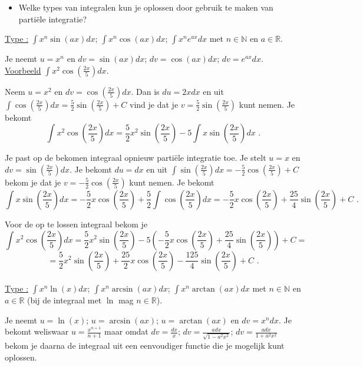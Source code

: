 \documentclass{article}
\begin{document}
\begin{itemize}
\item Welke types van integralen kun je oplossen door gebruik te maken van parti\"ele integratie?
\end{itemize}

\noindent \underline{Type :} $\int x^n \sin(ax)dx$; $\int x^n \cos (ax)dx$; $\int x^n e^{ax}dx$ met $n \in \mathbb{N}$ en $a \in \mathbb{R}$.

\noindent Je neemt $u=x^n$ en $dv=\sin (ax)dx$; $dv=\cos (ax)dx$; $dv=e^{ax}dx$.\\

\noindent \underline{Voorbeeld} $\int x^2 \cos \left( \frac{2x}{5}  \right)dx$.

Neem $u=x^2$ en $dv=\cos \left( \frac{2x}{5}  \right)dx$.
Dan is $du=2xdx$ en uit $\int \cos \left( \frac{2x}{5}  \right)dx=\frac{5}{2} \sin \left(  \frac{2x}{5} \right)+C$ vind je dat je $v=\frac{5}{2} \sin \left(  \frac{2x}{5} \right)$ kunt nemen.
Je bekomt
\[
\int x^2 \cos \left( \frac{2x}{5}  \right)dx=\frac{5}{2}x^2  \sin \left(  \frac{2x}{5} \right)-5\int x  \sin \left(  \frac{2x}{5} \right)dx \text { .}
\]

Je past op de bekomen integraal opnieuw parti\"ele integratie toe.
Je stelt $u=x$ en $dv= \sin \left(  \frac{2x}{5} \right)dx$.
Je bekomt $du=dx$ en uit $\int  \sin \left(  \frac{2x}{5} \right)dx=-\frac{5}{2}\cos \left(  \frac{2x}{5} \right)+C$ bekom je dat je $v=-\frac{5}{2}\cos \left(  \frac{2x}{5} \right)$ kunt nemen.
Je bekomt
\[
\int x  \sin \left(  \frac{2x}{5} \right)dx=-\frac{5}{2} x \cos \left(  \frac{2x}{5} \right)+\frac{5}{2}\int \cos \left( \frac{2x}{5}  \right)dx=-\frac{5}{2} x \cos \left(  \frac{2x}{5} \right)+\frac{25}{4}\sin \left( \frac{2x}{5} \right)+C \text { .}
\]

Voor de op te lossen integraal bekom je
\[
\int x^2 \cos \left( \frac{2x}{5}  \right)dx=\frac{5}{2}x^2  \sin \left(  \frac{2x}{5} \right)-5\left( -\frac{5}{2} x \cos \left(  \frac{2x}{5} \right)+\frac{25}{4}\sin \left( \frac{2x}{5} \right)   \right)+C=
\]
\[
=\frac{5}{2}x^2  \sin \left(  \frac{2x}{5} \right)+\frac{25}{2} x \cos \left(  \frac{2x}{5} \right)-\frac{125}{4}\sin \left( \frac{2x}{5} \right)  +C \text { .}
\]\\

\noindent \underline{Type :} $\int x^n \ln (x)dx$; $\int x^n \arcsin(ax)dx$; $\int x^n \arctan(ax)dx$ met $n \in \mathbb{N}$ en $a \in \mathbb{R}$ (bij de integraal met $\ln$ mag $n \in \mathbb{R}$).

\noindent Je neemt $u= \ln (x)$; $u=\arcsin (ax)$; $u=\arctan (ax)$ en $dv=x^n dx$.
Je bekomt weliswaar $u=\frac {x^{n+1}}{n+1}$ maar omdat $dv=\frac{dx}{x}$; $dv=\frac{adx}{\sqrt{1-a^2x^2}}$; $dv=\frac {adx}{1+a^2x^2}$ bekom je daarna de integraal uit een eenvoudiger functie die je mogelijk kunt oplossen.\\
\end{document}
